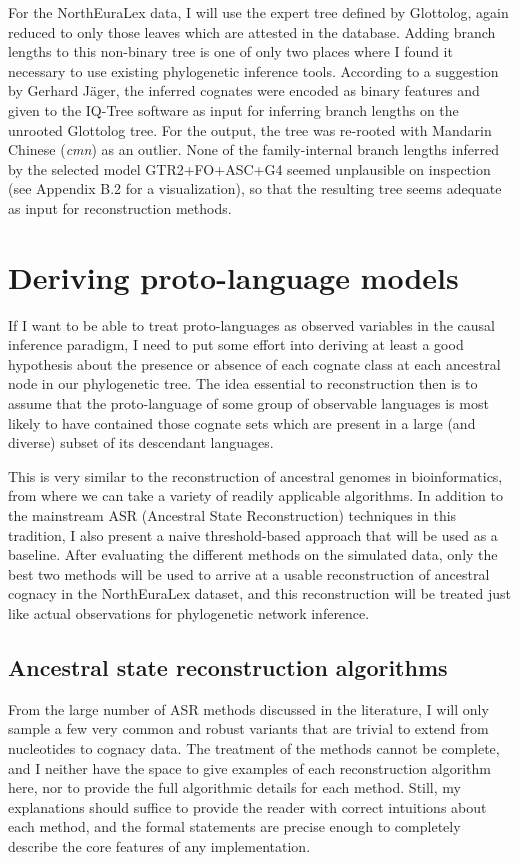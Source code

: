 For the NorthEuraLex data, I will use the expert tree defined by Glottolog, again reduced to only those leaves which are attested in the database. Adding branch lengths to this non-binary tree is one of only two places where I found it necessary to use existing phylogenetic inference tools. According to a suggestion by Gerhard Jäger, the inferred cognates were encoded as binary features and given to the IQ-Tree software \citep{nguyen_ea_2015} as input for inferring branch lengths on the unrooted Glottolog tree. For the output, the tree was re-rooted with Mandarin Chinese (\textit{cmn}) as an outlier. None of the family-internal branch lengths inferred by the selected model GTR2+FO+ASC+G4 seemed unplausible on inspection (see Appendix B.2 for a visualization), so that the resulting tree seems adequate as input for reconstruction methods.

\section{Deriving proto-language models}\label{sec:6.7}
If I want to be able to treat proto-languages as observed variables in the causal inference paradigm, I need to put some effort into deriving at least a good hypothesis about the presence or absence of each cognate class at each ancestral node in our phylogenetic tree. The idea essential to reconstruction then is to assume that the proto-language of some group of observable languages is most likely to have contained those cognate sets which are present in a large (and diverse) subset of its descendant languages.

This is very similar to the reconstruction of ancestral genomes in bioinformatics, from where we can take a variety of readily applicable algorithms. In addition to the mainstream ASR (Ancestral State Reconstruction) techniques in this tradition, I also present a naive threshold-based approach that will be used as a baseline. After evaluating the different methods on the simulated data, only the best two methods will be used to arrive at a usable reconstruction of ancestral cognacy in the NorthEuraLex dataset, and this reconstruction will be treated just like actual observations for phylogenetic network inference.

\subsection{Ancestral state reconstruction algorithms}
From the large number of ASR methods discussed in the literature, I will only sample a few very common and robust variants that are trivial to extend from nucleotides to cognacy data. The treatment of the methods cannot be complete, and I neither have the space to give examples of each reconstruction algorithm here, nor to provide the full algorithmic details for each method. Still, my explanations should suffice to provide the reader with correct intuitions about each method, and the formal statements are precise enough to completely describe the core features of any implementation.

